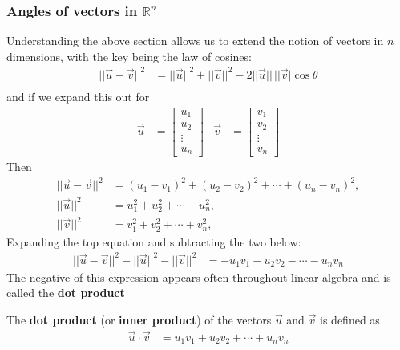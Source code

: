 \subsubsection{Angles of vectors in $\mathbb{R}^n$}

\label{subsect:angles:vectors}

Understanding the above section allows us to extend the notion of vectors in $n$ dimensions, with the key being the law of cosines:
\begin{align*}
||\vec{u}-\vec{v}||^2 & = ||\vec{u}||^2 + || \vec{v}||^2 -2 ||\vec{u}|| \,  ||\vec{v}| \cos \theta \\
\end{align*}
and if we expand this out for
%
\begin{align*}
\vec{u} & = \begin{bmatrix}
u_1 \\ u_2 \\ \vdots \\ u_n
\end{bmatrix} &
\vec{v} & = \begin{bmatrix}
v_1 \\ v_2 \\ \vdots \\ v_n
\end{bmatrix}
\end{align*}
Then
%
\begin{align*}
||\vec{u}-\vec{v}||^2 & = (u_1-v_1)^2 + (u_2-v_2)^2 + \cdots + (u_n -v_n)^2, \\
||\vec{u}||^2 & = u_1^2 + u_2^2 + \cdots + u_n^2, \\
||\vec{v}||^2 & = v_1^2 + v_2^2 + \cdots + v_n^2,
\end{align*}
Expanding the top equation and subtracting the two below:
%
\begin{align*}
||\vec{u}-\vec{v}||^2-||\vec{u}||^2-||\vec{v}||^2 & = -u_1v_1 - u_2v_2 - \cdots -u_nv_n
\end{align*}
The negative of this expression appears often throughout linear algebra and is called the \textbf{dot product}

\begin{definition}
The \textbf{dot product} (or \textbf{inner product}) of the vectors $\vec{u}$ and $\vec{v}$ is defined as
%
\begin{align*}
\vec{u} \cdot \vec{v} & = u_1v_1 + u_2v_2 + \cdots +u_nv_n
\end{align*}
\end{definition}

